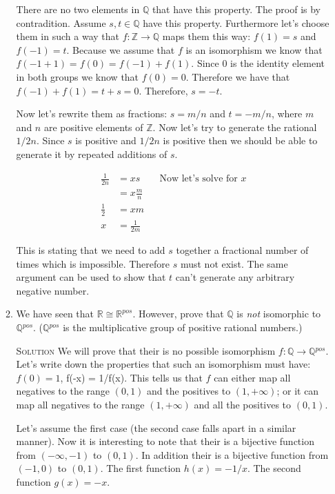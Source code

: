 \documentclass[twoside]{amsart}
\newcommand{\Rationals}{\mathbb{Q}{}}
\newcommand{\Reals}{\ensuremath{\mathbb{R}}\xspace}
\newcommand{\Integers}{\ensuremath{\mathbb{Z}{}}\xspace}
\newcommand{\solution}{\textsc{Solution}\xspace}
\newcommand{\iso}{\cong}
\newcommand{\blank}{\vspace{5pt}}
\begin{document}
\begin{enumerate}[A.]
\begin{enumerate}[1]
      There are no two elements in $\mathbb{Q}$ that have this property.
      The proof is by contradition. Assume $s, t \in \mathbb{Q}$ have
      this property. Furthermore let's choose them in such a way
      that $f : \Integers \to \mathbb{Q}$ maps them this way:
      $f(1) = s$ and $f(-1) = t$. Because we assume that $f$ is an
      isomorphism we know that $f(-1 + 1) = f(0) = f(-1) + f(1)$. Since
      $0$ is the identity element in both groups we know that $f(0) = 0$.
      Therefore we have that $f(-1) + f(1) = t + s = 0$. Therefore,
      $s = -t$.

      Now let's rewrite them as fractions: $s = m/n$ and $t = -m/n$,
      where $m$ and $n$ are positive elements of $\Integers$.
      Now let's try to generate the rational $1/2n$. 
      Since $s$ is positive and
      $1/2n$ is positive then we should be able to generate it by
      repeated additions of $s$.

      \begin{align*}
         \frac{1}{2n} &= xs       && \text{Now let's solve for $x$} \\
                      &= x \frac{m}{n}  \\
         \frac{1}{2}  &= xm             \\
         x &= \frac{1}{2m}
      \end{align*}

      This is stating that we need to add $s$ together a fractional
      number of times which is impossible. Therefore $s$ must not exist.
      The same argument can be used to show that $t$ can't generate
      any arbitrary negative number.

      \blank
      \item We have seen that $\Reals \iso \Reals^{pos}$. However,
      prove that $\Rationals$ is \emph{not} isomorphic to $\Rationals^{pos}$.
      ($\Rationals^{pos}$ is the multiplicative group of positive rational
      numbers.)

      \blank \noindent \solution We will prove that their is no
      possible isomorphism $f : \Rationals \to \Rationals^{pos}$.
      Let's write down the properties that such an isomorphism must have:
      $f(0) = 1$, f(-x) = 1/f(x). This tells us that $f$ can either map
      all negatives to the range $(0,1)$ and the positives to $(1,+\infty)$;
      or it can map all negatives to the range $(1,+\infty)$ and all the
      positives to $(0,1)$.

      Let's assume the first case (the second case falls apart in a similar
      manner). Now it is interesting to note that their is a bijective
      function from $(-\infty,-1)$ to $(0,1)$. In addition their is a
      bijective function from $(-1,0)$ to $(0,1)$. The first function
      $h(x) = -1/x$. The second function $g(x) = -x$. 


\end{enumerate}
\end{enumerate}
\end{document}
